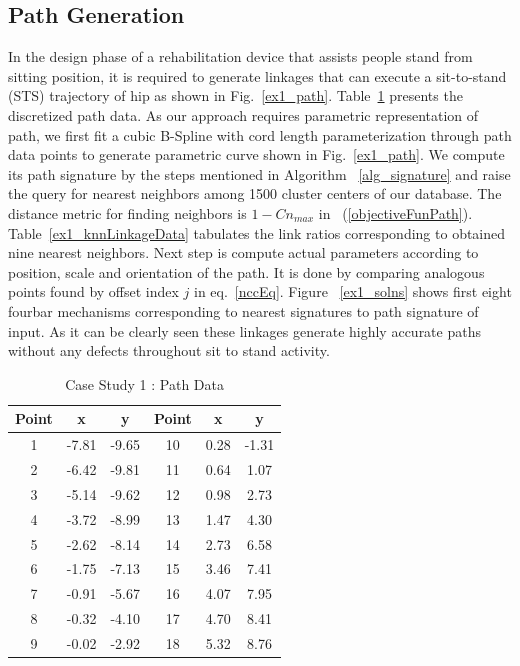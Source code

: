 \documentclass[twocolumn,10pt]{asme2e}
\newcommand{\req}[1]{(\ref{#1})}
\begin{document}
\subsection{Path Generation}
In the design phase of a rehabilitation device that assists people stand from sitting position, it is required to generate linkages that can execute a sit-to-stand (STS) trajectory of hip as shown in Fig.~\ref{ex1_path}.
Table~\ref{hipPathTab} presents the discretized path data.
As our approach requires parametric representation of path, we first fit a cubic B-Spline with cord length parameterization through path data points to generate parametric curve shown in Fig.~\ref{ex1_path}.
We compute its path signature by the steps mentioned in Algorithm ~\ref{alg_signature} and raise the query for nearest neighbors among 1500 cluster centers of our database.
The distance metric for finding neighbors is $1-Cn_{max}$ in ~\req{objectiveFunPath}.
Table~\ref{ex1_knnLinkageData} tabulates the link ratios corresponding to obtained nine nearest neighbors.
Next step is compute actual parameters according to position, scale and orientation of the path.
It is done by comparing analogous points found by offset index $j$ in eq.~\ref{nccEq}.
Figure ~\ref{ex1_solns} shows first eight fourbar mechanisms corresponding to nearest signatures to path signature of input.
As it can be clearly seen these linkages generate highly accurate paths without any defects throughout sit to stand activity.

\begin{table}
\caption{Case Study 1 : Path Data}
\centering
\label{hipPathTab}
\begin{tabular}{cccccc}
\hline
Point & x & y & Point & x & y \\
\hline
1 & -7.81 & -9.65 & 10 & 0.28 & -1.31 \\
2 & -6.42 & -9.81 & 11 & 0.64 & 1.07 \\
3 & -5.14 & -9.62 & 12 & 0.98 & 2.73 \\
4 & -3.72 & -8.99 & 13 & 1.47 & 4.30 \\
5 & -2.62 & -8.14 & 14 & 2.73 & 6.58 \\
6 & -1.75 & -7.13 & 15 & 3.46 & 7.41 \\
7 & -0.91 & -5.67 & 16 & 4.07 & 7.95 \\
8 & -0.32 & -4.10 & 17 & 4.70 & 8.41 \\
9 & -0.02 & -2.92 & 18 & 5.32 & 8.76 \\
\end{tabular}
\end{table}
\end{document}
